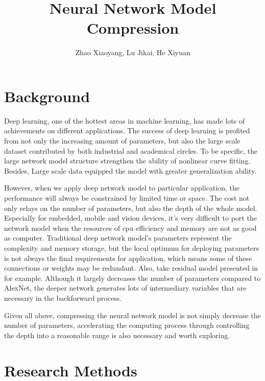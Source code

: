 \documentclass[a4paper]{article}
\title{\textbf{Neural Network Model Compression}}
\author{Zhao Xiaoyang, Lu Jikai, He Xiyuan}
\begin{document}
\maketitle

\section{Background}
\par Deep learning, one of the hottest areas in machine learning, has made lots of achievements on different applications. The success of deep learning is profited from not only the increasing amount of parameters, but also the large scale dataset contributed by both industrial and academical circles. To be specific, the large network model structure strengthen the ability of nonlinear curve fitting. Besides, Large scale data equipped the model with greater generalization ability.
\par However, when we apply deep network model to particular application, the performance will always be constrained by limited time or space. The cost not only relays on the number of parameters, but also the depth of the whole model. Especially for embedded, mobile and vision devices, it's very difficult to port the network model when the resources of cpu efficiency and memory are not as good as computer. Traditional deep network model's parameters represent the complexity and memory storage, but the local optimum for deploying parameters is not always the final requirements for application, which means some of these connections or weights may be redundant. Also, take residual model presented in \cite{residual} for example. Although it largely decreases the number of parameters compared to AlexNet, the deeper network generates lots of intermediary variables that are necessary in the backforward process. 
\par Given all above, compressing the neural network model is not simply decrease the number of parameters, accelerating the computing process through controlling the depth into a reasonable range is also necessary and worth exploring.

\section{Research Methods}
\end{document}
